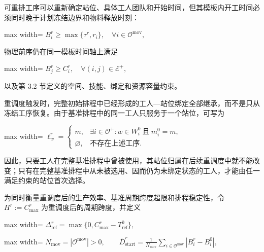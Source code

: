 \documentclass[journal,10pt]{IEEEtran}
\begin{document}
可重排工序可以重新确定站位、具体工人团队和开始时间，但其模板内开工时间必须同时晚于计划冻结边界和物料释放时刻：

\begin{center}
\begin{adjustbox}{max width=\columnwidth}
$\displaystyle
B_i^r\ge\max\{\tau^r,r_i\},
\quad \forall i\in\mathcal{O}^{\mathrm{mov}},
$
\end{adjustbox}
\end{center}

物理前序仍在同一模板时间轴上满足

\begin{center}
\begin{adjustbox}{max width=\columnwidth}
$\displaystyle
B_j^r\ge C_i^r,
\quad \forall(i,j)\in\mathcal E^+,
$
\end{adjustbox}
\end{center}

以及第 3.2 节定义的空间、技能、绑定和资源容量约束。

重调度触发时，完整初始排程中已经形成的工人---站位绑定全部继承，而不是只从冻结工序恢复。由于基准排程中的同一工人只服务于一个站位，可写为

\begin{center}
\begin{adjustbox}{max width=\columnwidth}
$\displaystyle
\ell_w^r=
\begin{cases}
m, & \exists i\in\mathcal{O}^{+}:
w\in W_i^0\ \text{且}\ m_i^0=m,\\
\varnothing, & \text{不存在上述工序}.
\end{cases}
$
\end{adjustbox}
\end{center}

因此，只要工人在完整基准排程中曾被使用，其站位归属在后续重调度中就不能改变；只有在完整基准排程中从未被选用、因而仍为未绑定状态的工人，才能由任一满足约束的站位首次选择。

为同时衡量重调度后的生产效率、基准周期跨度超限和排程稳定性，令 \(H^r:=C_{\max}^{r}\) 为重调度后的周期跨度，并定义

\begin{center}
\begin{adjustbox}{max width=\columnwidth}
$\displaystyle
\Delta_{\mathrm{ref}}^r=\max\{0,C_{\max}^{r}-T_{\mathrm{ref}}^0\},
$
\end{adjustbox}
\end{center}

\begin{center}
\begin{adjustbox}{max width=\columnwidth}
$\displaystyle
N_{\mathrm{mov}}=|\mathcal{O}^{\mathrm{mov}}|>0,
\qquad
\bar D_{\mathrm{start}}^r=
\frac{1}{N_{\mathrm{mov}}}
\sum_{i\in\mathcal{O}^{\mathrm{mov}}}
|B_i^r-B_i^0|,
$
\end{adjustbox}
\end{center}
\end{document}
